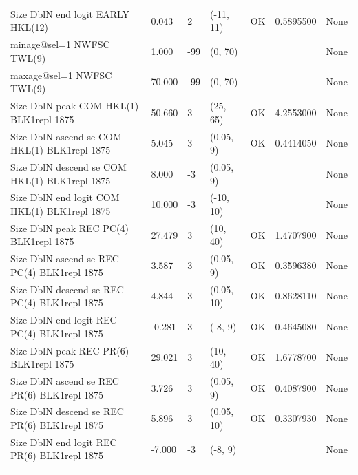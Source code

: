 \documentclass[
  english,
  a4paper,
]{article}
\begin{document}
\begin{landscape}
\begin{longtable}[t]{>{\raggedright\arraybackslash}p{8.5cm}lllll>{\raggedright\arraybackslash}p{4cm}}
Size DblN end logit EARLY HKL(12) & 0.043 & 2 & (-11, 11) & OK & 0.5895500 & None\\
minage@sel=1 NWFSC TWL(9) & 1.000 & -99 & (0, 70) &  &  & None\\
maxage@sel=1 NWFSC TWL(9) & 70.000 & -99 & (0, 70) &  &  & None\\
Size DblN peak COM HKL(1) BLK1repl 1875 & 50.660 & 3 & (25, 65) & OK & 4.2553000 & None\\
Size DblN ascend se COM HKL(1) BLK1repl 1875 & 5.045 & 3 & (0.05, 9) & OK & 0.4414050 & None\\
Size DblN descend se COM HKL(1) BLK1repl 1875 & 8.000 & -3 & (0.05, 9) &  &  & None\\
Size DblN end logit COM HKL(1) BLK1repl 1875 & 10.000 & -3 & (-10, 10) &  &  & None\\
Size DblN peak REC PC(4) BLK1repl 1875 & 27.479 & 3 & (10, 40) & OK & 1.4707900 & None\\
Size DblN ascend se REC PC(4) BLK1repl 1875 & 3.587 & 3 & (0.05, 9) & OK & 0.3596380 & None\\
Size DblN descend se REC PC(4) BLK1repl 1875 & 4.844 & 3 & (0.05, 10) & OK & 0.8628110 & None\\
Size DblN end logit REC PC(4) BLK1repl 1875 & -0.281 & 3 & (-8, 9) & OK & 0.4645080 & None\\
Size DblN peak REC PR(6) BLK1repl 1875 & 29.021 & 3 & (10, 40) & OK & 1.6778700 & None\\
Size DblN ascend se REC PR(6) BLK1repl 1875 & 3.726 & 3 & (0.05, 9) & OK & 0.4087900 & None\\
Size DblN descend se REC PR(6) BLK1repl 1875 & 5.896 & 3 & (0.05, 10) & OK & 0.3307930 & None\\
Size DblN end logit REC PR(6) BLK1repl 1875 & -7.000 & -3 & (-8, 9) &  &  & None\\*
\end{longtable}
\endgroup{}
\end{landscape}
\endgroup{}
\end{document}
